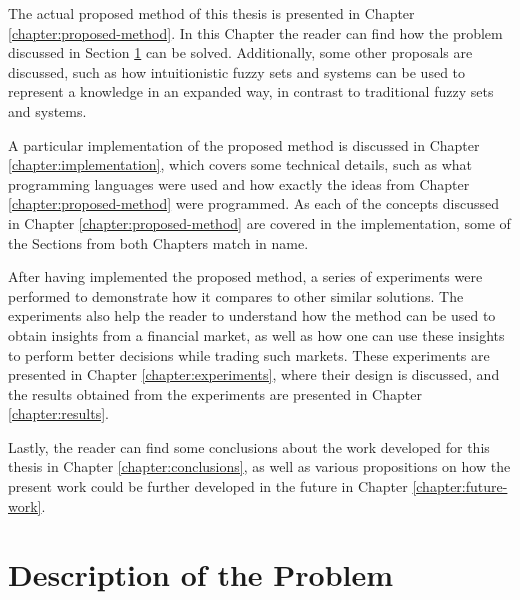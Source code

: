 The actual proposed method of this thesis is presented in Chapter \ref{chapter:proposed-method}. In this Chapter the reader can find how the problem discussed in Section \ref{section:description-of-the-problem} can be solved. Additionally, some other proposals are discussed, such as how intuitionistic fuzzy sets and systems can be used to represent a knowledge in an expanded way, in contrast to traditional fuzzy sets and systems.

A particular implementation of the proposed method is discussed in Chapter \ref{chapter:implementation}, which covers some technical details, such as what programming languages were used and how exactly the ideas from Chapter \ref{chapter:proposed-method} were programmed. As each of the concepts discussed in Chapter \ref{chapter:proposed-method} are covered in the implementation, some of the Sections from both Chapters match in name.

After having implemented the proposed method, a series of experiments were performed to demonstrate how it compares to other similar solutions. The experiments also help the reader to understand how the method can be used to obtain insights from a financial market, as well as how one can use these insights to perform better decisions while trading such markets. These experiments are presented in Chapter \ref{chapter:experiments}, where their design is discussed, and the results obtained from the experiments are presented in Chapter \ref{chapter:results}.

Lastly, the reader can find some conclusions about the work developed for this thesis in Chapter \ref{chapter:conclusions}, as well as various propositions on how the present work could be further developed in the future in Chapter \ref{chapter:future-work}.

\section{Description of the Problem}
\label{section:description-of-the-problem}


